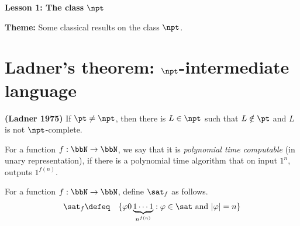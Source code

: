 \documentclass[11pt, a4paper]{article}
\renewcommand{\lesson}{1}
\renewcommand{\lessontitle}{The class $\npt$}
\renewcommand{\fulltitle}{Lesson \lesson: \lessontitle}
\begin{document}
\date{}



\begin{center}
{\Large {\bf \fulltitle}}
\end{center}
\vspace{0.5cm}

\noindent
{\bf Theme:} Some classical results on the class $\npt$.


\section{Ladner's theorem: $\npt$-intermediate language}
\label{sec:ladner}

\begin{theorem}
\label{theo:ladner}
{\bf (Ladner 1975)}
If $\pt\neq \npt$,
then there is $L\in \npt$ such that $L\notin \pt$
and $L$ is not $\npt$-complete. 
\end{theorem}

For a function $f:\bbN\to \bbN$,
we say that it is {\em polynomial time computable} (in unary representation),
if there is a polynomial time algorithm that on input $1^n$, outputs $1^{f(n)}$.

For a function $f:\bbN\to \bbN$,
define $\sat_f$ as follows.
\begin{eqnarray*}
\sat_f & \defeq & \{\varphi0 \underbrace{1\cdots 1}_{n^{f(n)}} : \varphi \in \sat \ \text{and}\ |\varphi|=n\}
\end{eqnarray*}
\end{document}
